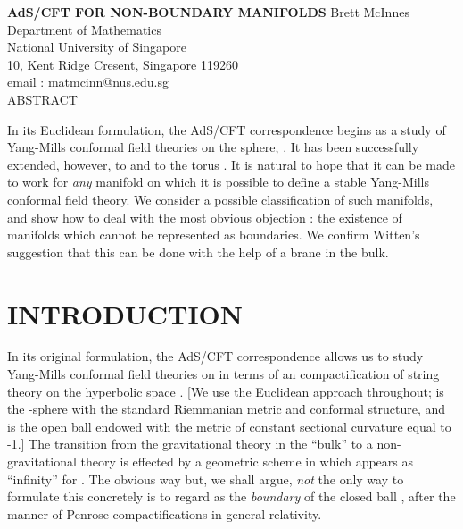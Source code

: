 \documentclass[a4paper,12pt]{article}
\theoremstyle{definition}
\renewcommand{\u}{\textit}
\renewcommand{\-}{\myHighlight{$\dfrac{\quad\enspace}{\quad}$}\coordHE{}}
\begin{document}
\begin{titlepage}
\setlength{\baselineskip}{16pt}
\begin{center}
\vskip 1in
{\large \textbf{AdS/CFT FOR NON-BOUNDARY MANIFOLDS}}
\vskip 1in
Brett McInnes
\break
Department of Mathematics\\
National University of Singapore\\
10, Kent Ridge Cresent, Singapore 119260\\
email : matmcinn@nus.edu.sg\\
\vskip 1in
ABSTRACT
\end{center}

In its Euclidean formulation, the AdS/CFT correspondence begins as a study of Yang-Mills conformal field theories on the sphere, \coordHE{}. It has been successfully extended, however, to \coordHE{} and to the torus \coordHE{}. It is natural to hope that it can be made to work for \u{any} manifold on which it is possible to define a stable Yang-Mills conformal field theory. We consider a possible classification of such manifolds, and show how to deal with the most obvious objection : the existence of manifolds which cannot be represented as boundaries. We confirm Witten's suggestion that this can be done with the help of a brane in the bulk.




\end{titlepage}
\setlength{\baselineskip}{20pt}

\renewcommand{\thesection}{\Roman{section}}
\section{\large INTRODUCTION}
In its original formulation, the AdS/CFT correspondence \cite{1} allows us to study Yang-Mills conformal field theories on \coordHE{} in terms of an \coordHE{} compactification of string theory on the hyperbolic space \coordHE{}. [We use the Euclidean approach throughout; \coordHE{} is the \coordHE{}-sphere with the standard Riemmanian metric and conformal structure, and \coordHE{} is the open ball \coordHE{} endowed with the metric of constant sectional curvature equal to -1.] The transition from the gravitational theory in the ``bulk'' to a non-gravitational theory is effected by a geometric scheme in which \coordHE{} appears as ``infinity'' for \coordHE{}. The obvious way \- but, we shall argue, \u{not} the only way \- to formulate this concretely is to regard \coordHE{} as the \u{boundary} of the closed ball \coordHE{}, after the manner of Penrose compactifications \cite{2} in general relativity.
\end{document}
